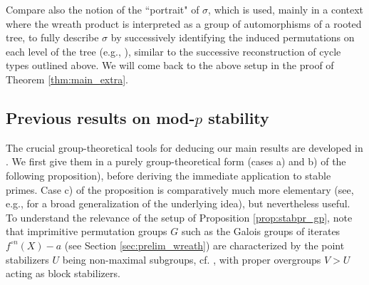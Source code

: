 \documentclass[a4paper]{amsart}
\begin{document}
Compare also the notion of the ``portrait" of $\sigma$, which is used, mainly in a context where the wreath product is interpreted as a group of automorphisms of a rooted tree, to fully describe $\sigma$ by successively identifying the induced permutations on each level of the tree (e.g., \cite{Bartholdi}), similar to the successive reconstruction of cycle types outlined above.
We will come back to the above setup in the proof of Theorem \ref{thm:main_extra}.
  
  \subsection{Previous results on mod-$p$ stability}
  \label{sec:stabpr_gp}
  The crucial group-theoretical tools for deducing our main results are developed in \cite{Koe24}. We first give them in a purely group-theoretical form (cases a) and b) of the following proposition), before deriving the immediate application to stable primes.
  Case c) of the proposition is comparatively much more elementary (see, e.g., \cite{KNR} for a broad generalization of the underlying idea), but nevertheless useful. To understand the relevance of the setup of Proposition \ref{prop:stabpr_gp}, note that imprimitive permutation groups $G$ such as the Galois groups of iterates $f^{\circ n}(X)-a$ (see Section \ref{sec:prelim_wreath}) are characterized by the point stabilizers $U$ being non-maximal subgroups, cf. \cite[Corollary 1.5A]{DM}, with proper overgroups $V>U$ acting as block stabilizers.  
\end{document}
